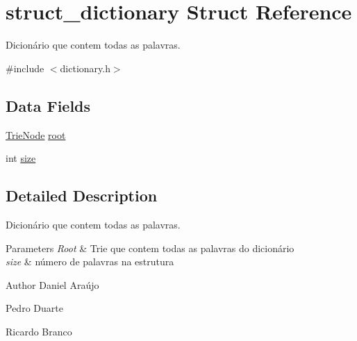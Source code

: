 \hypertarget{structstruct__dictionary}{\section{struct\+\_\+dictionary Struct Reference}
\label{structstruct__dictionary}
}


Dicionário que contem todas as palavras.  




{\ttfamily \#include $<$dictionary.\+h$>$}

\subsection*{Data Fields}
\begin{DoxyCompactItemize}
\item 
\hyperlink{dictionary_8h_a47ec1d70ec2a806865ab835255d31e2a}{Trie\+Node} \hyperlink{structstruct__dictionary_a06c8b67fb49a1a231098e945e62cc30b}{root}
\item 
int \hyperlink{structstruct__dictionary_a439227feff9d7f55384e8780cfc2eb82}{size}
\end{DoxyCompactItemize}


\subsection{Detailed Description}
Dicionário que contem todas as palavras. 


\begin{DoxyParams}{Parameters}
{\em Root} & Trie que contem todas as palavras do dicionário \\
\hline
{\em size} & número de palavras na estrutura \\
\hline
\end{DoxyParams}
\begin{DoxyAuthor}{Author}
Daniel Araújo 

Pedro Duarte 

Ricardo Branco 
\end{DoxyAuthor}


